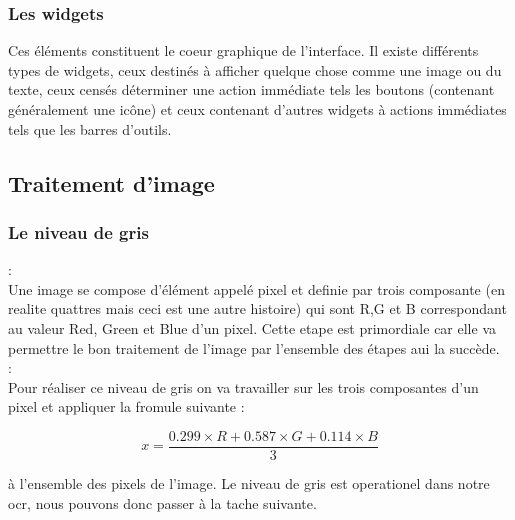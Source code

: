 \documentclass{article}
\begin{document}
\subsubsection{Les widgets}
Ces éléments constituent le coeur graphique de l’interface. Il existe différents types de widgets, ceux destinés à afficher quelque chose comme une image ou du texte, ceux censés déterminer une action immédiate tels les boutons (contenant généralement une icône) et ceux contenant d’autres widgets à actions
immédiates tels que les barres d’outils.



\subsection{Traitement d'image}
\subsubsection{Le niveau de gris}
:\\
Une image se compose d'élément appelé pixel et definie par trois composante (en realite quattres mais ceci est une autre histoire) qui sont R,G et B correspondant au valeur Red, Green et Blue d'un pixel. Cette etape est primordiale car elle va permettre le bon traitement de l'image par l'ensemble des étapes aui la succède.\\
:\\
Pour réaliser ce niveau de gris on va travailler sur les trois composantes d'un pixel et appliquer la fromule suivante :
\\
\begin{center}
\[x = \frac{0.299 \times R + 0.587 \times G + 0.114 \times B}{3}\]
\end{center}
à l'ensemble des pixels de l'image. Le niveau de gris est operationel dans notre ocr, nous pouvons donc passer à la tache suivante.
\end{document}
